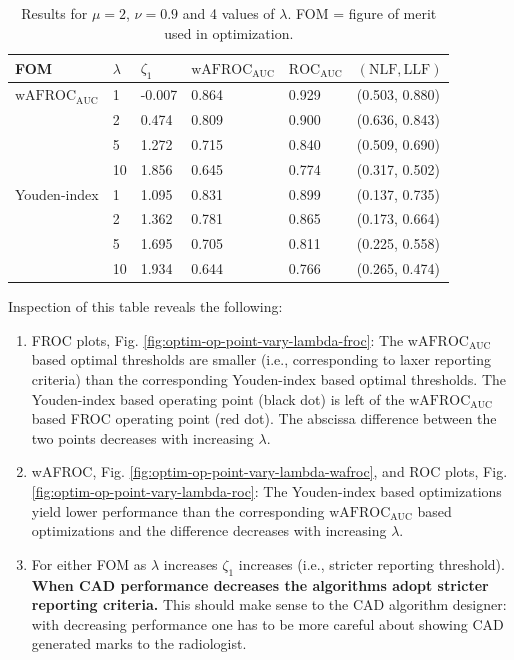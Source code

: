 \documentclass[
]{book}
\begin{document}
\begin{table}

\caption{\label{tab:optim-op-point-table-vary-lambda}Results for $\mu = 2$, $\nu = 0.9$ and 4 values of $\lambda$. FOM = figure of merit used in optimization.}
\centering
\fontsize{10}{12}\selectfont
\begin{tabular}[t]{llllll}
\toprule
FOM & $\lambda$ & $\zeta_1$ & $\text{wAFROC}_\text{AUC}$ & $\text{ROC}_\text{AUC}$ & $\left( \text{NLF}, \text{LLF}\right)$\\
\midrule
$\text{wAFROC}_\text{AUC}$ & 1 & -0.007 & 0.864 & 0.929 & (0.503, 0.880)\\
 & 2 & 0.474 & 0.809 & 0.900 & (0.636, 0.843)\\
 & 5 & 1.272 & 0.715 & 0.840 & (0.509, 0.690)\\
 & 10 & 1.856 & 0.645 & 0.774 & (0.317, 0.502)\\
Youden-index & 1 & 1.095 & 0.831 & 0.899 & (0.137, 0.735)\\
\addlinespace
 & 2 & 1.362 & 0.781 & 0.865 & (0.173, 0.664)\\
 & 5 & 1.695 & 0.705 & 0.811 & (0.225, 0.558)\\
 & 10 & 1.934 & 0.644 & 0.766 & (0.265, 0.474)\\
\bottomrule
\end{tabular}
\end{table}

Inspection of this table reveals the following:

\begin{enumerate}
\def\labelenumi{\arabic{enumi}.}
\item
  FROC plots, Fig. \ref{fig:optim-op-point-vary-lambda-froc}: The \(\text{wAFROC}_\text{AUC}\) based optimal thresholds are smaller (i.e., corresponding to laxer reporting criteria) than the corresponding Youden-index based optimal thresholds. The Youden-index based operating point (black dot) is left of the \(\text{wAFROC}_\text{AUC}\) based FROC operating point (red dot). The abscissa difference between the two points decreases with increasing \(\lambda\).
\item
  wAFROC, Fig. \ref{fig:optim-op-point-vary-lambda-wafroc}, and ROC plots, Fig. \ref{fig:optim-op-point-vary-lambda-roc}: The Youden-index based optimizations yield lower performance than the corresponding \(\text{wAFROC}_\text{AUC}\) based optimizations and the difference decreases with increasing \(\lambda\).
\item
  For either FOM as \(\lambda\) increases \(\zeta_1\) increases (i.e., stricter reporting threshold). \textbf{When CAD performance decreases the algorithms adopt stricter reporting criteria.} This should make sense to the CAD algorithm designer: with decreasing performance one has to be more careful about showing CAD generated marks to the radiologist.
\end{enumerate}
\end{document}
